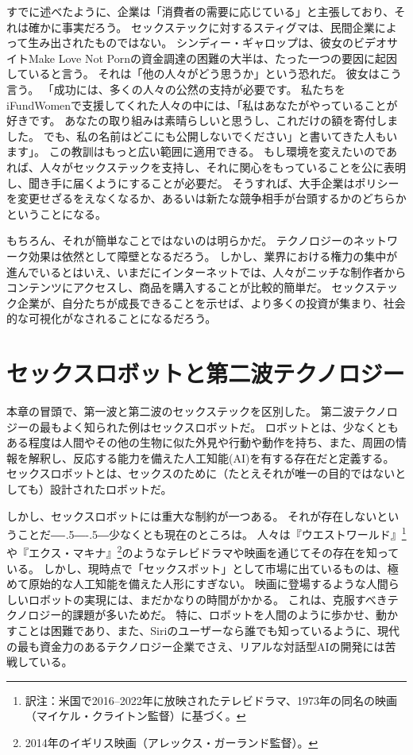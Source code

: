 \documentclass[paper=a4,book,openany]{jlreq}
\def\DDASH{―\kern-.5\zw―\kern-.5\zw―} %
\begin{document}
すでに述べたように、企業は「消費者の需要に応じている」と主張しており、それは確かに事実だろう。
セックステックに対するスティグマは、民間企業によって生み出されたものではない。
シンディー・ギャロップは、彼女のビデオサイトMake Love Not Pornの資金調達の困難の大半は、たった一つの要因に起因していると言う。
それは「他の人々がどう思うか」という恐れだ。
彼女はこう言う。
「成功には、多くの人々の公然の支持が必要です。
私たちをiFundWomenで支援してくれた人々の中には、「私はあなたがやっていることが好きです。
あなたの取り組みは素晴らしいと思うし、これだけの額を寄付しました。
でも、私の名前はどこにも公開しないでください」と書いてきた人もいます」\citep{manning17:_sextec_revol_will_not_be_crowd}。
この教訓はもっと広い範囲に適用できる。
もし環境を変えたいのであれば、人々がセックステックを支持し、それに関心をもっていることを公に表明し、聞き手に届くようにすることが必要だ。
そうすれば、大手企業はポリシーを変更せざるをえなくなるか、あるいは新たな競争相手が台頭するかのどちらかということになる。

もちろん、それが簡単なことではないのは明らかだ。
テクノロジーのネットワーク効果は依然として障壁となるだろう。
しかし、業界における権力の集中が進んでいるとはいえ、いまだにインターネットでは、人々がニッチな制作者からコンテンツにアクセスし、商品を購入することが比較的簡単だ。
セックステック企業が、自分たちが成長できることを示せば、より多くの投資が集まり、社会的な可視化がなされることになるだろう。

\section{セックスロボットと第二波テクノロジー}

本章の冒頭で、第一波と第二波のセックステックを区別した。
第二波テクノロジーの最もよく知られた例はセックスロボットだ。
ロボットとは、少なくともある程度は人間やその他の生物に似た外見や行動や動作を持ち、また、周囲の情報を解釈し、反応する能力を備えた人工知能(AI)を有する存在だと定義する\citep{danaher17:_shoul_we_be_think_sex_robot}。
セックスロボットとは、セックスのために（たとえそれが唯一の目的ではないとしても）設計されたロボットだ。

しかし、セックスロボットには重大な制約が一つある。
それが存在しないということだ{\DDASH}少なくとも現在のところは。
人々は『ウエストワールド』\footnote{訳注：米国で2016--2022年に放映されたテレビドラマ、1973年の同名の映画（マイケル・クライトン監督）に基づく。}や『エクス・マキナ』\footnote{2014年のイギリス映画（アレックス・ガーランド監督）。}のようなテレビドラマや映画を通じてその存在を知っている。
しかし、現時点で「セックスボット」として市場に出ているものは、極めて原始的な人工知能を備えた人形にすぎない。
映画に登場するような人間らしいロボットの実現には、まだかなりの時間がかかる。
これは、克服すべきテクノロジー的課題が多いためだ。
特に、ロボットを人間のように歩かせ、動かすことは困難であり、また、Siriのユーザーなら誰でも知っているように、現代の最も資金力のあるテクノロジー企業でさえ、リアルな対話型AIの開発には苦戦している。
\end{document}
